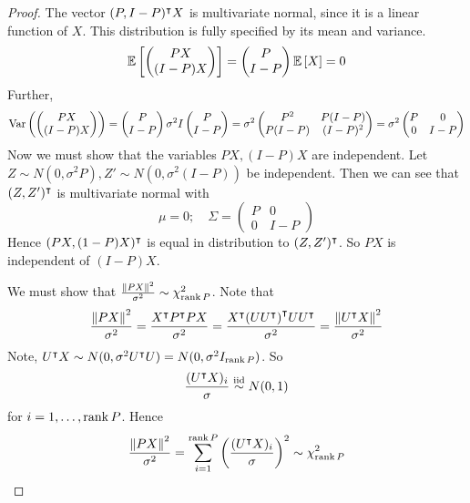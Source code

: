 \begin{proof}
	The vector \( (P, I-P)^\intercal X \) is multivariate normal, since it is a linear function of \( X \).
	This distribution is fully specified by its mean and variance.
	\[ \mathbb{E}\left[{\begin{pmatrix}
		PX \\
		(I-P)X
	\end{pmatrix}}\right] = \begin{pmatrix}
		P \\
		I-P
	\end{pmatrix} \mathbb{E}\left[{X}\right] = 0 \]
	Further,
	\[ \operatorname{Var}\left({\begin{pmatrix}
		PX \\
		(I-P)X
	\end{pmatrix}}\right) = \begin{pmatrix}
		P \\
		I - P
	\end{pmatrix} \sigma^2 I \begin{pmatrix}
		P \\
		I - P
	\end{pmatrix} = \sigma^2 \begin{pmatrix}
		P^2 & P(I-P) \\
		P(I-P) & (I-P)^2
	\end{pmatrix} = \sigma^2 \begin{pmatrix}
		P & 0 \\
		0 & I-P
	\end{pmatrix} \]
	Now we must show that the variables \( PX, (I-P)X \) are independent.
	Let \( Z \sim N(0,\sigma^2 P), Z' \sim N(0,\sigma^2(I-P)) \) be independent.
	Then we can see that \( (Z, Z')^\intercal \) is multivariate normal with
	\[ \mu = 0;\quad \Sigma = \begin{pmatrix}
		P & 0 \\
		0 & I - P
	\end{pmatrix} \]
	Hence \( (PX, (1-P)X)^\intercal \) is equal in distribution to \( (Z, Z')^\intercal \).
	So \( PX \) is independent of \( (I-P)X \).

	We must show that \( \frac{\norm{PX}^2}{\sigma^2} \sim \chi^2_{\rank P} \).
	Note that
	\[ \frac{\norm{PX}^2}{\sigma^2} = \frac{X^\intercal P^\intercal P X}{\sigma^2} = \frac{X^\intercal \qty(U U^\intercal)^\intercal U U^\intercal}{\sigma^2} = \frac{\norm{U^\intercal X}^2}{\sigma^2} \]
	Note, \( U^\intercal X \sim N(0,\sigma^2 U^\intercal U) = N(0,\sigma^2 I_{\rank P}) \).
	So
	\[ \frac{(U^\intercal X)_i}{\sigma} \overset{\text{iid}}{\sim} N(0,1) \]
	for \( i = 1, \dots, \rank P \).
	Hence
	\[ \frac{\norm{PX}^2}{\sigma^2} = \sum_{i=1}^{\rank P} \qty(\frac{(U^\intercal X)_i}{\sigma})^2 \sim \chi^2_{\rank P} \]
\end{proof}
